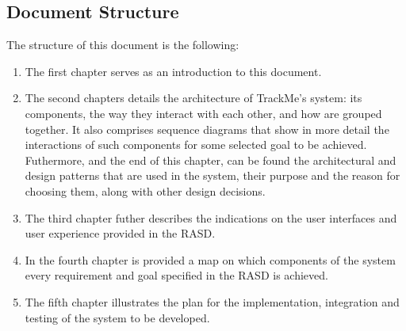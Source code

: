 \documentclass[../main.tex]{subfiles}
\begin{document}
\subsection{Document Structure}

The structure of this document is the following:

\begin{enumerate}

	\item The first chapter serves as an introduction to this document.
	\item The second chapters details the architecture of TrackMe's system: its components, the way they interact with each other, and how are grouped together. It also comprises sequence diagrams that show in more detail the interactions of such components for some selected goal to be achieved. Futhermore, and the end of this chapter, can be found the architectural and design patterns that are used in the system, their purpose and the reason for choosing them, along with other design decisions.
	\item The third chapter futher describes the indications on the user interfaces and user experience provided in the RASD.
	\item In the fourth chapter is provided a map on which components of the system every requirement and goal specified in the RASD is achieved.
	\item The fifth chapter illustrates the plan for the implementation, integration and testing of the system to be developed.

\end{enumerate}
\end{document}
